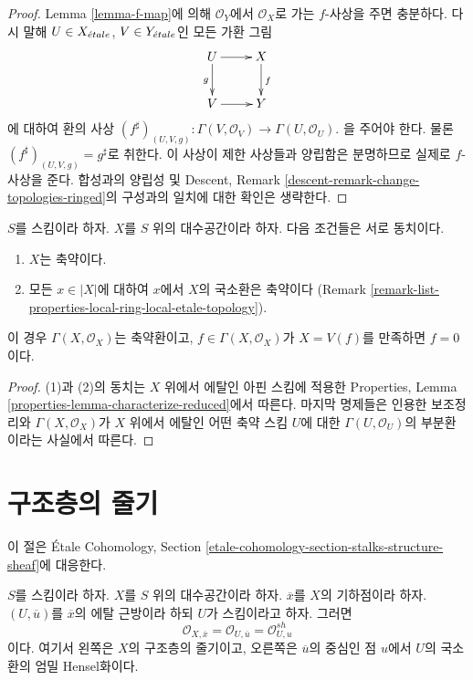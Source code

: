 \begin{proof}
Lemma \ref{lemma-f-map}에 의해 $\mathcal{O}_Y$에서
$\mathcal{O}_X$로 가는 $f$-사상을 주면 충분하다.
다시 말해 $U \in X_{\acute{e}tale}$, $V \in Y_{\acute{e}tale}$인 모든 가환 그림
$$
\xymatrix{
U \ar[d]_g \ar[r] & X \ar[d]^f \\
V \ar[r] & Y
}
$$
에 대하여 환의 사상
$
(f^\sharp)_{(U, V, g)} :
\Gamma(V, \mathcal{O}_V)
\to
\Gamma(U, \mathcal{O}_U).
$
을 주어야 한다. 물론
$(f^\sharp)_{(U, V, g)} = g^\sharp$로 취한다.
이 사상이 제한 사상들과 양립함은 분명하므로 실제로
$f$-사상을 준다. 합성과의 양립성 및 Descent, Remark
\ref{descent-remark-change-topologies-ringed}의 구성과의 일치에 대한
확인은 생략한다.
\end{proof}

\begin{lemma}
\label{lemma-reduced-space}
$S$를 스킴이라 하자. $X$를 $S$ 위의 대수공간이라 하자.
다음 조건들은 서로 동치이다.
\begin{enumerate}
\item $X$는 축약이다.
\item 모든 $x \in |X|$에 대하여 $x$에서 $X$의 국소환은 축약이다
(Remark \ref{remark-list-properties-local-ring-local-etale-topology}).
\end{enumerate}
이 경우 $\Gamma(X, \mathcal{O}_X)$는 축약환이고,
$f \in \Gamma(X, \mathcal{O}_X)$가 $X = V(f)$를 만족하면 $f = 0$이다.
\end{lemma}

\begin{proof}
(1)과 (2)의 동치는 $X$ 위에서 에탈인 아핀 스킴에 적용한
Properties, Lemma \ref{properties-lemma-characterize-reduced}에서
따른다.
마지막 명제들은 인용한 보조정리와
$\Gamma(X, \mathcal{O}_X)$가 $X$ 위에서 에탈인 어떤 축약 스킴
$U$에 대한 $\Gamma(U, \mathcal{O}_U)$의 부분환이라는 사실에서 따른다.
\end{proof}

\section{구조층의 줄기}
\label{section-stalks-structure-sheaf}

\noindent
이 절은 \'Etale Cohomology, Section
\ref{etale-cohomology-section-stalks-structure-sheaf}에 대응한다.

\begin{lemma}
\label{lemma-describe-etale-local-ring}
$S$를 스킴이라 하자.
$X$를 $S$ 위의 대수공간이라 하자.
$\overline{x}$를 $X$의 기하점이라 하자.
$(U, \overline{u})$를 $\overline{x}$의 에탈 근방이라 하되
$U$가 스킴이라고 하자. 그러면
$$
\mathcal{O}_{X, \overline{x}} =
\mathcal{O}_{U, \overline{u}} =
\mathcal{O}_{U, u}^{sh}
$$
이다. 여기서 왼쪽은 $X$의 구조층의 줄기이고, 오른쪽은
$\overline{u}$의 중심인 점 $u$에서 $U$의 국소환의 엄밀 Hensel화이다.
\end{lemma}

